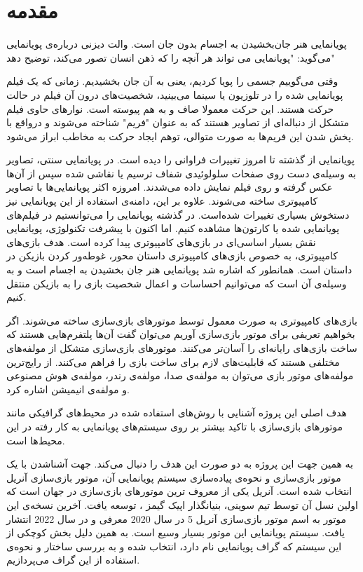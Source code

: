 \chapter{مقدمه}






پویانمایی هنر جان‌بخشیدن به اجسام بدون جان است.
والت دیزنی درباره‌‌ی پویانمایی می‌گوید: "پویانمایی می تواند هر آنچه را که ذهن انسان تصور می‌کند، توضیح دهد"

وقتی می‌گوییم جسمی را پویا کردیم، یعنی به آن جان بخشیدیم.
زمانی که یک فیلم پویانمایی شده را در تلوزیون یا سینما می‌بینید، شخصیت‌های درون آن فیلم در حالت حرکت هستند.
این حرکت معمولا صاف و به هم پیوسته است. نوارهای حاوی فیلم متشکل از دنباله‌ای از تصاویر هستند که به عنوان "فریم" شناخته می‌شوند و درواقع با پخش شدن این فریم‌ها
به صورت متوالی، توهم ایجاد حرکت به مخاطب ابراز می‌شود.

پویانمایی از گذشته تا امروز تغییرات فراوانی را دیده است.
در پویانمایی سنتی، تصاویر به وسیله‌‌ی دست روی صفحات سلولوئیدی شفاف ترسیم یا نقاشی شده 
سپس از آن‌ها عکس گرفته و روی فیلم نمایش داده می‌شدند.
امروزه اکثر پویانمایی‌ها با تصاویر کامپیوتری
ساخته می‌شوند.
\cite{AnimationWikipedia}
علاوه بر این، دامنه‌ی استفاده از این پویانمایی نیز دستخوش بسیاری تغییرات شده‌است.
در گذشته پویانمایی را می‌توانستیم در فیلم‌های پویانمایی شده یا کارتون‌ها مشاهده کنیم.
اما اکنون با پیشرفت تکنولوژی، پویانمایی نقش بسیار اساسی‌ای در بازی‌های کامپیوتری پیدا کرده است.
هدف بازی‌‌های کامپیوتری، به خصوص بازی‌های کامپیوتری داستان محور، غوطه‌ور کردن بازیکن 
در داستان است.
همانطور که اشاره شد پویانمایی هنر جان بخشیدن به اجسام است و به وسیله‌ی 
آن است که می‌توانیم احساسات و اعمال شخصیت بازی را به بازیکن منتقل کنیم.

بازی‌های کامپیوتری به صورت معمول توسط موتور‌های بازی‌سازی ساخته می‌شوند.
اگر بخواهیم تعریفی برای موتور بازی‌سازی آوریم می‌توان گفت 
آن‌ها پلتفرم‌هایی هستند که ساخت بازی‌های رایانه‌ای را آسان‌تر می‌کنند.
موتور‌های بازی‌سازی متشکل از مولفه‌های مختلفی هستند که قابلیت‌های لازم برای ساخت بازی را فراهم می‌کنند.
از رایج‌ترین مولفه‌های موتور بازی می‌توان به مولفه‌ی صدا، مولفه‌ی رندر، مولفه‌ی هوش مصنوعی و مولفه‌ی انیمیشن اشاره کرد.
\cite{barczak2019comparative}

هدف اصلی این پروژه آشنایی با روش‌های استفاده شده در محیط‌های گرافیکی مانند موتورهای بازی‌سازی با تاکید بیشتر بر 
روی سیستم‌های پویانمایی به کار رفته در این محیط‌ها است.

به همین جهت این پروژه به دو صورت این هدف را دنبال می‌کند.
جهت آشناشدن با یک موتور بازی‌سازی و نحوه‌ی پیاده‌سازی سیستم پویانمایی آن، موتور 
بازی‌سازی آنریل انتخاب شده است.
آنریل یکی از معروف ترین موتور‌های بازی‌سازی در جهان است که اولین نسل آن
توسط تیم سوینی، بنیانگذار اپیک گیمز 
، توسعه یافت.
آخرین نسخه‌ی این موتور به اسم موتور بازی‌سازی آنریل 5 
در سال 2020 معرفی و در سال 2022 انتشار یافت.
سیستم پویانمایی این موتور بسیار وسیع است. به همین دلیل بخش کوچکی از این سیستم که گراف پویانمایی نام دارد، انتخاب شده و
 به بررسی ساختار و نحوه‌ی استفاده از این گراف می‌پردازیم.

